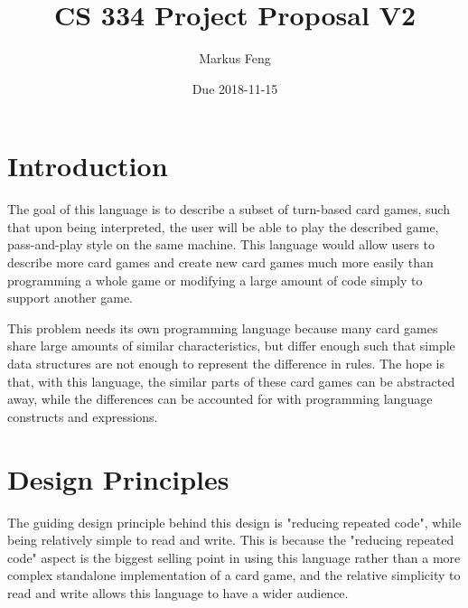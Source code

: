 \documentclass{article}
\title{CS 334 Project Proposal V2}
\author{Markus Feng}
\date{Due 2018-11-15}
\begin{document}
\maketitle

\section{Introduction}
The goal of this language is to describe a subset of turn-based card games, such that upon being interpreted, the user will be able to play the described game, pass-and-play style on the same machine. This language would allow users to describe more card games and create new card games much more easily than programming a whole game or modifying a large amount of code simply to support another game.

This problem needs its own programming language because many card games share large amounts of similar characteristics, but differ enough such that simple data structures are not enough to represent the difference in rules. The hope is that, with this language, the similar parts of these card games can be abstracted away, while the differences can be accounted for with programming language constructs and expressions.

\section{Design Principles}
The guiding design principle behind this design is "reducing repeated code", while being relatively simple to read and write. This is because the "reducing repeated code" aspect is the biggest selling point in using this language rather than a more complex standalone implementation of a card game, and the relative simplicity to read and write allows this language to have a wider audience.
\end{document}
